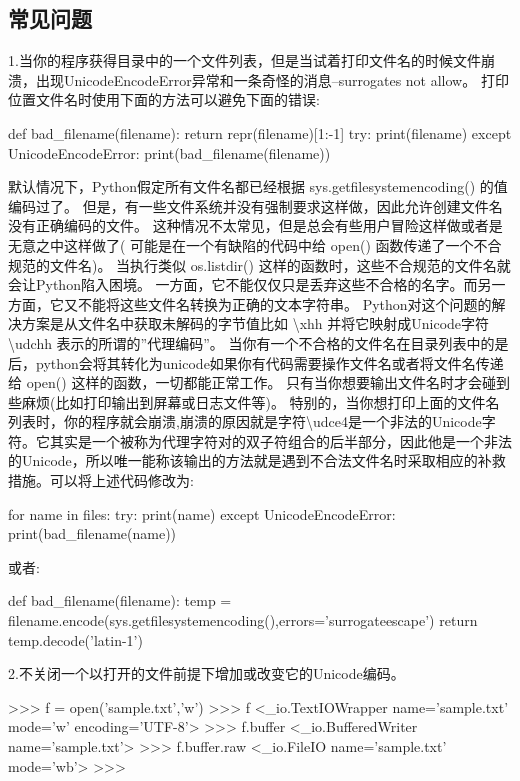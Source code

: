 \subsection{常见问题}
1.当你的程序获得目录中的一个文件列表，但是当试着打印文件名的时候文件崩溃，出现UnicodeEncodeError异常和一条奇怪的消息--surrogates not allow。\newline
打印位置文件名时使用下面的方法可以避免下面的错误:
\begin{python}
def bad_filename(filename):
    return repr(filename)[1:-1]
try:
    print(filename)
except UnicodeEncodeError:
    print(bad_filename(filename))
\end{python}
默认情况下，Python假定所有文件名都已经根据 sys.getfilesystemencoding() 的值编码过了。 但是，有一些文件系统并没有强制要求这样做，因此允许创建文件名没有正确编码的文件。 这种情况不太常见，但是总会有些用户冒险这样做或者是无意之中这样做了( 可能是在一个有缺陷的代码中给 open() 函数传递了一个不合规范的文件名)。
当执行类似 os.listdir() 这样的函数时，这些不合规范的文件名就会让Python陷入困境。 一方面，它不能仅仅只是丢弃这些不合格的名字。而另一方面，它又不能将这些文件名转换为正确的文本字符串。 Python对这个问题的解决方案是从文件名中获取未解码的字节值比如 \textbackslash xhh 并将它映射成Unicode字符 \textbackslash udchh 表示的所谓的”代理编码”。 当你有一个不合格的文件名在目录列表中的是后，python会将其转化为unicode如果你有代码需要操作文件名或者将文件名传递给 open() 这样的函数，一切都能正常工作。 只有当你想要输出文件名时才会碰到些麻烦(比如打印输出到屏幕或日志文件等)。 特别的，当你想打印上面的文件名列表时，你的程序就会崩溃,崩溃的原因就是字符\textbackslash udce4是一个非法的Unicode字符。它其实是一个被称为代理字符对的双子符组合的后半部分，因此他是一个非法的Unicode，所以唯一能称该输出的方法就是遇到不合法文件名时采取相应的补救措施。可以将上述代码修改为:
\begin{python}
for name in files:
    try:
        print(name)
    except UnicodeEncodeError:
        print(bad_filename(name))
\end{python}
或者:
\begin{python}
def bad_filename(filename):
    temp = filename.encode(sys.getfilesystemencoding(),errors='surrogateescape')
    return temp.decode('latin-1')
\end{python}
2.不关闭一个以打开的文件前提下增加或改变它的Unicode编码。
\begin{python}
>>> f = open('sample.txt','w')
>>> f
<_io.TextIOWrapper name='sample.txt' mode='w' encoding='UTF-8'>
>>> f.buffer
<_io.BufferedWriter name='sample.txt'>
>>> f.buffer.raw
<_io.FileIO name='sample.txt' mode='wb'>
>>>
\end{python}
